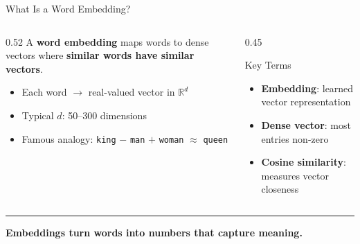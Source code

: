 \documentclass[8pt,aspectratio=169]{beamer}
\newcommand{\bottomnote}[1]{%
\vfill
\vspace{-2mm}
\textcolor{mllavender2}{\rule{\textwidth}{0.4pt}}
\vspace{1mm}
\footnotesize
\textbf{#1}
}
\newenvironment{compactlist}{%
  \begin{itemize}%
    \setlength{\itemsep}{2pt}%
    \setlength{\parskip}{0pt}%
    \setlength{\parsep}{0pt}%
}{%
  \end{itemize}%
}
\newcommand{\highlight}[1]{\textcolor{mlorange}{\textbf{#1}}}
\begin{document}
\begin{frame}{What Is a Word Embedding?}
\begin{columns}[T]
\begin{column}{0.52\textwidth}
A \highlight{word embedding} maps words to dense vectors where
\textbf{similar words have similar vectors}.

\vspace{4pt}
\begin{compactlist}
  \item Each word $\rightarrow$ real-valued vector in $\mathbb{R}^d$
  \item Typical $d$: 50--300 dimensions
  \item Famous analogy: \texttt{king} $-$ \texttt{man} $+$ \texttt{woman} $\approx$ \texttt{queen}
\end{compactlist}
\end{column}
\begin{column}{0.45\textwidth}
\begin{block}{Key Terms}
\begin{compactlist}
  \item \textbf{Embedding}: learned vector representation
  \item \textbf{Dense vector}: most entries non-zero
  \item \textbf{Cosine similarity}: measures vector closeness
\end{compactlist}
\end{block}
\end{column}
\end{columns}

\bottomnote{Embeddings turn words into numbers that capture meaning.}
\end{frame}
\end{document}
